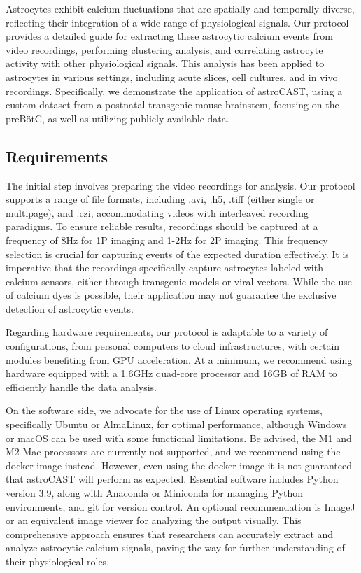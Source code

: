 
Astrocytes exhibit calcium fluctuations that are spatially and temporally diverse, reflecting their integration of a wide range of physiological signals\citep{semyanov_making_2020,smedler_frequency_2014}. Our protocol provides a detailed guide for extracting these astrocytic calcium events from video recordings, performing clustering analysis, and correlating astrocyte activity with other physiological signals. This analysis has been applied to astrocytes in various settings, including acute slices, cell cultures, and in vivo recordings. Specifically, we demonstrate the application of astroCAST, using a custom dataset from a postnatal transgenic mouse brainstem, focusing on the \ac{preBötC}, as well as utilizing publicly available data.

\subsection{Requirements}
The initial step involves preparing the video recordings for analysis. Our protocol supports a range of file formats, including .avi, .h5, .tiff (either single or multipage), and .czi, accommodating videos with interleaved recording paradigms. To ensure reliable results, recordings should be captured at a frequency of 8Hz for \ac{1P} imaging and 1-2Hz for \ac{2P} imaging. This frequency selection is crucial for capturing events of the expected duration effectively. It is imperative that the recordings specifically capture astrocytes labeled with calcium sensors, either through transgenic models or viral vectors. While the use of calcium dyes is possible, their application may not guarantee the exclusive detection of astrocytic events.

Regarding hardware requirements, our protocol is adaptable to a variety of configurations, from personal computers to cloud infrastructures, with certain modules benefiting from GPU acceleration. At a minimum, we recommend using hardware equipped with a 1.6GHz quad-core processor and 16GB of RAM to efficiently handle the data analysis.

On the software side, we advocate for the use of Linux operating systems, specifically Ubuntu or AlmaLinux, for optimal performance, although Windows or macOS can be used with some functional limitations. Be advised, the M1 and M2 Mac processors are currently not supported, and we recommend using the docker image instead. However, even using the docker image it is not guaranteed that astroCAST will perform as expected. Essential software includes Python version 3.9, along with Anaconda or Miniconda for managing Python environments, and git for version control. An optional recommendation is ImageJ or an equivalent image viewer for analyzing the output visually. This comprehensive approach ensures that researchers can accurately extract and analyze astrocytic calcium signals, paving the way for further understanding of their physiological roles.